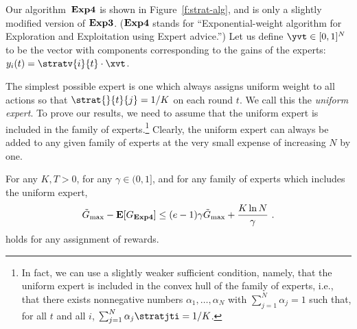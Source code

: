\documentclass[12pt]{article}
\newcommand{\E}{\mbox{\rm\bf E}}
\newcommand{\Aest}{{\bf Exp3}}
\newcommand{\Astrat}{{\bf Exp4}}
\newcommand{\Gbestst}{\tilde{G}_{\rm max}}
\begin{document}
Our algorithm~$\Astrat$ is shown in Figure~\ref{f:strat-alg}, and is
only a slightly modified version of $\Aest$. ($\Astrat$ stands for
``{Exp}onential-weight algorithm for {Exp}loration and {Exp}loitation
using Expert advice.'')
Let us define $\yvt\in [0,1]^N$ to be the vector with components
corresponding to the gains of the experts:
$y_i(t) = \stratv{i}{t} \cdot \xvt$.

The simplest possible expert is one which always assigns uniform
weight to all actions so that $\strat{}{t}{j} = 1/K$ on each round
$t$. We call this the {\em uniform expert}.
To prove our results, we need to assume that the uniform expert is
included in the family of experts.\footnote{%
In fact, we can use a slightly weaker sufficient condition, namely,
that the uniform expert is included in the convex hull of the family
of experts, i.e., that there exists nonnegative numbers
$\alpha_1,\ldots,\alpha_N$ with $\sum_{j=1}^N \alpha_j=1$ such that, for
all $t$ and all $i$, $\sum_{j=1}^N \alpha_j \stratjti = 1/K$.}
Clearly, the uniform expert can always be added to any given family of
experts at the very small expense of increasing $N$ by one.
%
\begin{theorem} \label{thm:astrat}
For any $K,T > 0$, for any $\gamma\in(0,1]$, and for any family of experts which
includes the uniform expert,
\[
        \Gbestst -\E[G_{\Astrat}]
        \leq 
    (e-1)\gamma\Gbestst + \frac{K\ln N}{\gamma}~.
\]
holds for any assignment of rewards.
\end{theorem}
%
\end{document}
